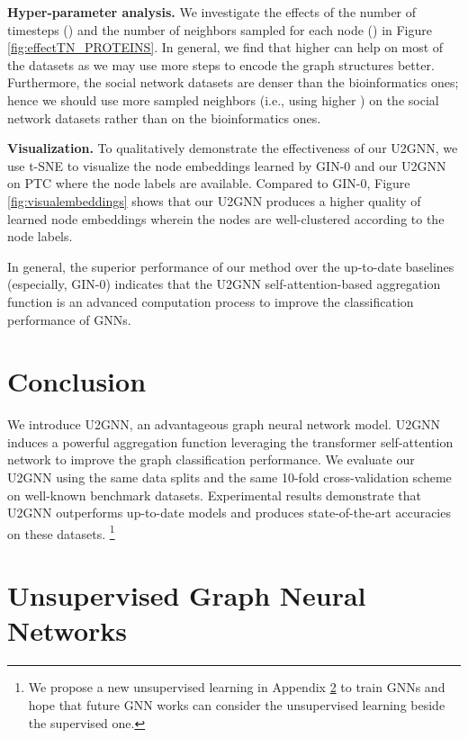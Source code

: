 \documentclass[twoside,leqno,twocolumn]{article}
\newcommand{\citep}{\cite}
\begin{document}
\textbf{Hyper-parameter analysis.} We investigate the effects of the number of timesteps () and the number of neighbors sampled for each node () in Figure \ref{fig:effectTN_PROTEINS}.
In general, we find that higher  can help on most of the datasets as we may use more steps  to encode the graph structures better.
Furthermore, the social network datasets are denser than the bioinformatics ones; hence we should use more sampled neighbors (i.e., using higher ) on the social network datasets rather than on the bioinformatics ones.


\textbf{Visualization.} To qualitatively demonstrate the effectiveness of our U2GNN, we use t-SNE \citep{maaten2008visualizing} to visualize the node embeddings learned by GIN-0 and our U2GNN on \textsc{PTC} where the node labels are available.
Compared to GIN-0, Figure \ref{fig:visualembeddings} shows that our U2GNN produces a higher quality of learned node embeddings wherein the nodes are well-clustered according to the node labels.

In general, the superior performance of our method over the up-to-date baselines (especially, \mbox{GIN-0}) indicates that the U2GNN self-attention-based aggregation function is an advanced computation process to improve the classification performance of GNNs.


\section{Conclusion}
\label{sec:conclusion}

We introduce U2GNN, an advantageous graph neural network model.
U2GNN induces a powerful aggregation function leveraging the transformer self-attention network to improve the graph classification performance. 
We evaluate our U2GNN using the same data splits and the same 10-fold cross-validation scheme on well-known benchmark datasets. 
Experimental results demonstrate that U2GNN outperforms up-to-date models and produces state-of-the-art accuracies on these datasets.
\footnote{We propose a new unsupervised learning in Appendix \ref{apd:a} to train GNNs and hope that future GNN works can consider the unsupervised learning beside the supervised one.}







\balance


\appendix

\section{Unsupervised Graph Neural Networks}\label{apd:a}
\end{document}
